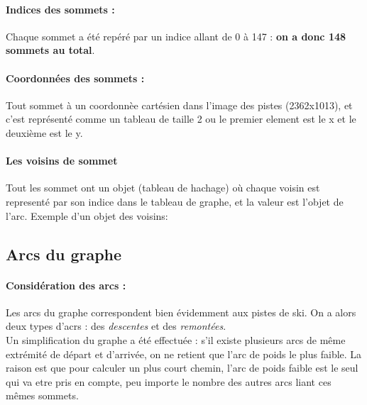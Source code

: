 \documentclass{article}
\begin{document}
			\paragraph{Indices des sommets :\\}
			Chaque sommet a \'et\'e rep\'er\'e par un indice allant de 0 \`a 147 : \textbf{on a donc 148 sommets au total}.
			\paragraph{Coordonn\'ees des sommets :\\}
			Tout sommet \`a un coordonn\`ee cart\'esien dans l'image des pistes (2362x1013), et c'est repr\'esent\'e comme un tableau de taille 2 ou le premier element est le x et le deuxi\`eme est le y.
			\paragraph{Les voisins de sommet}
			Tout les sommet ont un objet (tableau de hachage) o\`u chaque voisin est represent\'e par son indice dans le tableau de graphe, et la valeur est l'objet de l'arc.
			Exemple d'un objet des voisins:\\
	
		\subsection{Arcs du graphe}
			\paragraph{Consid\'eration des arcs :\\}
			Les arcs du graphe correspondent bien \'evidemment aux pistes de ski. On a alors deux types d'acrs : des \textit{descentes} et des
			\textit{remont\'ees}.\\
			Un simplification du graphe a \'et\'e effectu\'ee : s'il existe plusieurs arcs de m\^eme extr\'emit\'e de d\'epart et d'arriv\'ee, 
			on ne retient que l'arc de poids le plus faible. La raison est que pour calculer un plus court chemin, l'arc de poids faible est 
			le seul qui va etre pris en compte, peu importe le nombre des autres arcs liant ces mêmes sommets.
\end{document}
